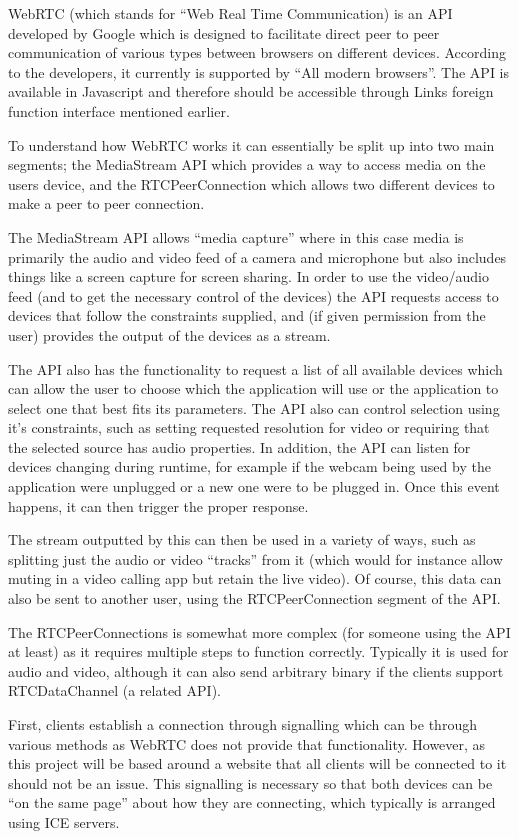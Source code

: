 \documentclass[bsc,frontabs,singlespacing,parskip,deptreport]{infthesis}
\begin{document}
WebRTC (which stands for “Web Real Time Communication) is an API developed by Google which is designed to facilitate direct peer to peer communication of various types between browsers on different devices.  According to the developers, it currently is supported by “All modern browsers”.  The API is available in Javascript and therefore should be accessible through Links foreign function interface mentioned earlier.

To understand how WebRTC works it can essentially be split up into two main segments; the MediaStream API which provides a way to access media on the users device, and the RTCPeerConnection which allows two different devices to make a peer to peer connection.

The MediaStream API allows “media capture” where in this case media is primarily the audio and video feed of a camera and microphone but also includes things like a screen capture for screen sharing.  In order to use the video/audio feed (and to get the necessary control of the devices) the API requests access to devices that follow the constraints supplied, and (if given permission from the user) provides the output of the devices as a stream.

The API also has the functionality to request a list of all available devices which can allow the user to choose which the application will use or the application to select one that best fits its parameters.  The API also can control selection using it’s constraints, such as setting requested resolution for video or requiring that the selected source has audio properties. In addition, the API can listen for devices changing during runtime, for example if the webcam being used by the application were unplugged or a new one were to be plugged in.  Once this event happens, it can then trigger the proper response.

The stream outputted by this can then be used in a variety of ways, such as splitting just the audio or video “tracks” from it (which would for instance allow muting in a video calling app but retain the live video).  Of course, this data can also be sent to another user, using the RTCPeerConnection segment of the API.

The RTCPeerConnections is somewhat more complex (for someone using the API at least) as it requires multiple steps to function correctly.  Typically it is used for audio and video, although it can also send arbitrary binary if the clients support RTCDataChannel (a related API).

First, clients establish a connection through signalling which can be through various methods as WebRTC does not provide that functionality.  However, as this project will be based around a website that all clients will be connected to it should not be an issue. This signalling is necessary so that both devices can be “on the same page” about how they are connecting, which typically is arranged using ICE servers.
\end{document}
